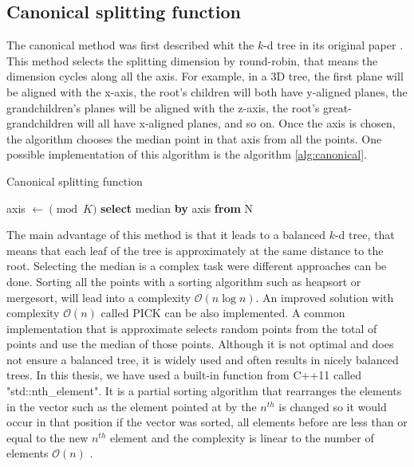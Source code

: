 \subsection{Canonical splitting function}
The canonical method was first described whit the $k$-d tree in its original paper \cite{Bentley}. This method selects the splitting dimension by round-robin, that means the dimension cycles along all the axis. For example, in a 3D tree, the first plane will be aligned with the x-axis, the root's children will both have y-aligned planes, the grandchildren's planes will be aligned with the z-axis, the root's great-grandchildren will all have x-aligned planes, and so on. Once the axis is chosen, the algorithm chooses the median point in that axis from all the points. One possible implementation of this algorithm is the algorithm \ref{alg:canonical}.
\begin{algorithm}[h!]
    \caption{Canonical splitting function
        \label{alg:canonical}}
    \begin{algorithmic}[1]
    \Statex
        \State axis $\gets \pmod{K}$ 
        \State \textbf{select} median \textbf{by} axis \textbf{from} N
        \State {}
    \EndFunction
    \end{algorithmic}
\end{algorithm}

The main advantage of this method is that it leads to a balanced $k$-d tree, that means that each leaf of the tree is approximately at the same distance to the root. Selecting the median is a complex task were different approaches can be done. Sorting all the points with a sorting algorithm such as heapsort or mergesort, will lead into a complexity $\mathcal{O}(n\log{}n)$. An improved solution with complexity $\mathcal{O}(n)$ called PICK \cite{BLUM1973448} can be also implemented. A common implementation that is approximate selects random points from the total of points and use the median of those points. Although it is not optimal and does not ensure a balanced tree, it is widely used and often results in nicely balanced trees. In this thesis, we have used a built-in function from C++11 called "std::nth\_element". It is a partial sorting algorithm that rearranges the elements in the vector such as the element pointed at by the $n^{th}$ is changed so it would occur in that position if the vector was sorted, all elements before are less than or equal to the new $n^{th}$ element and the complexity is linear to the number of elements $\mathcal{O}(n)$ \cite{C++11iso}.

